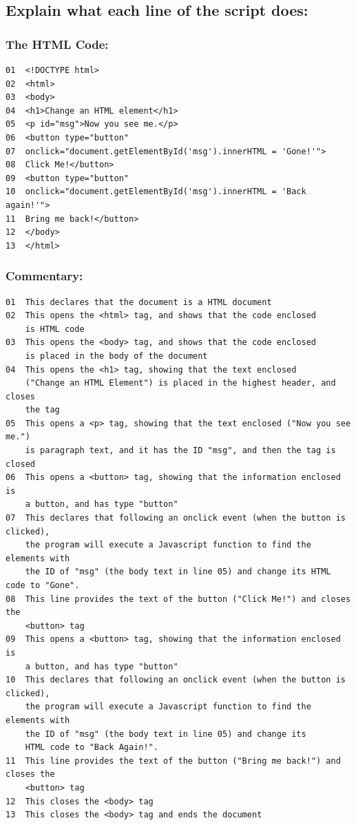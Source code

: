 \documentclass[a4paper]{article}
\begin{document}
\subsection{Explain what each line of the script does:}
\subsubsection{The HTML Code:}
\begin{lstlisting}
01	<!DOCTYPE html>
02	<html>
03	<body>
04	<h1>Change an HTML element</h1>
05	<p id="msg">Now you see me.</p>
06	<button type="button"
07	onclick="document.getElementById('msg').innerHTML = 'Gone!'">
08	Click Me!</button>
09	<button type="button"
10	onclick="document.getElementById('msg').innerHTML = 'Back again!'">
11	Bring me back!</button>
12	</body>
13	</html>
\end{lstlisting}
\subsubsection{Commentary:}
\begin{lstlisting}
01	This declares that the document is a HTML document
02	This opens the <html> tag, and shows that the code enclosed 
	is HTML code
03	This opens the <body> tag, and shows that the code enclosed 
	is placed in the body of the document
04	This opens the <h1> tag, showing that the text enclosed 
	("Change an HTML Element") is placed in the highest header, and closes
	the tag
05	This opens a <p> tag, showing that the text enclosed ("Now you see me.")
	is paragraph text, and it has the ID "msg", and then the tag is closed
06	This opens a <button> tag, showing that the information enclosed is 
	a button, and has type "button"
07	This declares that following an onclick event (when the button is clicked),
	the program will execute a Javascript function to find the elements with 
	the ID of "msg" (the body text in line 05) and change its HTML code to "Gone".
08	This line provides the text of the button ("Click Me!") and closes the 
	<button> tag
09	This opens a <button> tag, showing that the information enclosed is 
	a button, and has type "button"
10	This declares that following an onclick event (when the button is clicked),
	the program will execute a Javascript function to find the elements with 
	the ID of "msg" (the body text in line 05) and change its 
	HTML code to "Back Again!".
11	This line provides the text of the button ("Bring me back!") and closes the 
	<button> tag
12	This closes the <body> tag
13	This closes the <body> tag and ends the document
\end{lstlisting}
\newpage
\end{document}
